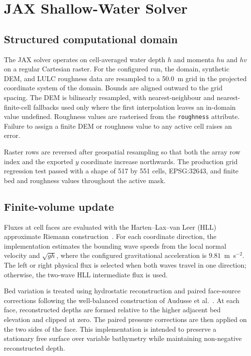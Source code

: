 \section{JAX Shallow-Water Solver}
\label{sec:jax-solver}

\subsection{Structured computational domain}

The JAX solver operates on cell-averaged water depth \(h\) and momenta \(hu\)
and \(hv\) on a regular Cartesian raster.  For the configured run, the domain,
synthetic DEM, and LULC roughness data are resampled to a 50.0~m grid in the
projected coordinate system of the domain.  Bounds are aligned outward to the
grid spacing.  The DEM is bilinearly resampled, with nearest-neighbour and
nearest-finite-cell fallbacks used only where the first interpolation leaves an
in-domain value undefined.  Roughness values are rasterised from the
\texttt{roughness} attribute.  Failure to assign a finite DEM or roughness
value to any active cell raises an error.

Raster rows are reversed after geospatial resampling so that both the array row
index and the exported \(y\) coordinate increase northwards.  The production
grid regression test passed with a shape of 517 by 551 cells, EPSG:32643, and
finite bed and roughness values throughout the active mask.

\subsection{Finite-volume update}

Fluxes at cell faces are evaluated with the Harten--Lax--van Leer (HLL)
approximate Riemann construction~\cite{HartenLaxVanLeer1983}.  For each
coordinate direction, the implementation estimates the bounding wave speeds
from the local normal velocity and \(\sqrt{gh}\), where the configured
gravitational acceleration is \(9.81\)~m~s\(^{-2}\).  The left or right
physical flux is selected when both waves travel in one direction; otherwise,
the two-wave HLL intermediate flux is used.

Bed variation is treated using hydrostatic reconstruction and paired
face-source corrections following the well-balanced construction of
Audusse et al.~\cite{AudusseEtAl2004}.  At each face, reconstructed depths are
formed relative to the higher adjacent bed elevation and clipped at zero.
The paired pressure corrections are then applied on the two sides of the
face.  This implementation is intended to preserve a stationary free surface
over variable bathymetry while maintaining non-negative reconstructed depth.

